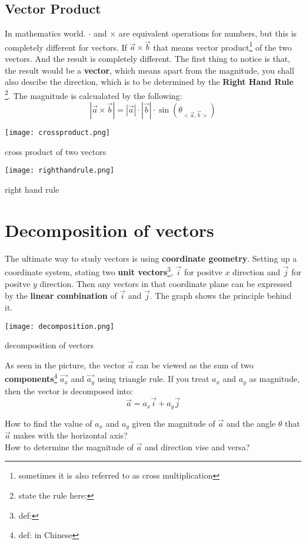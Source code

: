 \documentclass[a4paper]{tufte-handout}
\newenvironment{SummBox}
{\begin{tcolorbox}[breakable,colback=r1!30,colframe=r1,title=Summary]} {\end{tcolorbox}}
\begin{document}
\subsection*{Vector Product}
In mathematics world. $\cdot$ and $\times$ are equivalent operations for numbers, but this is completely different for vectors. If $\vec{a} \times \vec{b}$ that means vector product\footnote{sometimes it is also referred to as cross multiplication} of the two vectors. And the result is completely different. 
The first thing to notice is that, the result would be a \textbf{vector}, which means apart from the magnitude, you shall also descibe the direction, which is to be determined by the \textbf{Right Hand Rule} \footnote{state the rule here:}. The magnitude is calcualated by the following:
\begin{equation}
	|\vec{a} \times \vec{b}| = |\vec{a}| \cdot |\vec{b}| \cdot \sin (\theta_{<\vec{a},\vec{b}>})
\end{equation}

\begin{marginfigure}
\texttt{[image: crossproduct.png]}
\caption{cross product of two vectors}
\end{marginfigure}

\begin{marginfigure}
\texttt{[image: righthandrule.png]}
\caption{right hand rule}
\end{marginfigure}

\section{Decomposition of vectors}
The ultimate way to study vectors is using \textbf{coordinate geometry}. Setting up a coordinate system, stating two \textbf{unit vectors}\footnote{def:}, $\vec{i}$ for positve $x$ direction and $\vec{j}$ for positve $y$ direction. Then any vectors in that coordinate plane can be expressed by the \textbf{linear combination} of $\vec{i}$ and $\vec{j}$. The graph shows the principle behind it.
\begin{marginfigure}
\texttt{[image: decomposition.png]}
\caption{decomposition of vectors}
\end{marginfigure}

As seen in the picture, the vector $\vec{a}$ can be viewed as the sum of two \textbf{components}\footnote{def: in Chinese} $\vec{a_x}$ and $\vec{a_y}$ using triangle rule. If you treat $a_x$ and $a_y$ as magnitude, then the vector is decomposed into:
\[
	\vec{a}= a_x \vec{i} + a_y \vec{j}
\]
\begin{SummBox}
How to find the value of $a_x$ and $a_y$ given the magnitude of $\vec{a}$ and the angle $\theta$ that $\vec{a}$ makes with the horizontal axis?\\
How to determine the magnitude of $\vec{a}$ and direction vise and versa?
\end{SummBox}
\end{document}
